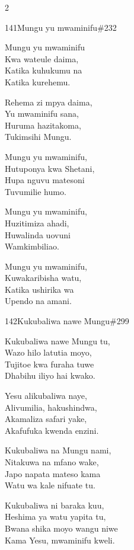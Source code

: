 \begin{multicols}{2}
\begin{hymn}{141}{Mungu yu mwaminifu}{\#232}
\begin{stanza}
Mungu yu mwaminifu\\
Kwa wateule daima,\\
Katika kuhukumu na\\
Katika kurehemu.
\end{stanza}
\begin{chorus}
Rehema zi mpya daima,\\
Yu mwaminifu sana,\\
Huruma hazitakoma,\\
Tukimsihi Mungu.
\end{chorus}
\begin{stanza}
Mungu yu mwaminifu,\\
Hutuponya kwa Shetani,\\
Hupa nguvu matesoni\\
Tuvumilie humo.
\end{stanza}
\begin{stanza}
Mungu yu mwaminifu,\\
Huzitimiza ahadi,\\
Huwalinda uovuni\\
Wamkimbiliao.
\end{stanza}
\begin{stanza}
Mungu yu mwaminifu,\\
Kuwakaribisha watu,\\
Katika ushirika wa\\
Upendo na amani.
\end{stanza}
\end{hymn}

\begin{hymn}{142}{Kukubaliwa nawe Mungu}{\#299}
\begin{stanza}
Kukubaliwa nawe Mungu tu,\\
Wazo hilo latutia moyo,\\
Tujitoe kwa furaha tuwe\\
Dhabihu iliyo hai kwako.
\end{stanza}
\begin{stanza}
Yesu alikubaliwa naye,\\
Alivumilia, hakushindwa,\\
Akamaliza safari yake,\\
Akafufuka kwenda enzini.
\end{stanza}
\begin{stanza}
Kukubaliwa na Mungu nami,\\
Nitakuwa na mfano wake,\\
Japo napata mateso kama\\
Watu wa kale nifuate tu.
\end{stanza}
\begin{stanza}
Kukubaliwa ni baraka kuu,\\
Heshima ya watu yapita tu,\\
Bwana shika moyo wangu niwe\\
Kama Yesu, mwaminifu kweli.
\end{stanza}
\end{hymn}


\end{multicols}
